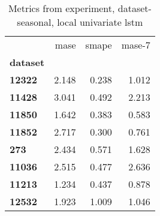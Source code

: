 \begin{table}[h]
\centering
\caption{Metrics from experiment, dataset-seasonal, local univariate lstm}
\label{table:local-univariate-lstm-dataset-seasonal}
\begin{tabular}{lrrr}
\toprule
{} &   mase &  smape &  mase-7 \\
\textbf{dataset} &        &        &         \\
\midrule
\textbf{12322  } &  2.148 &  0.238 &   1.012 \\
\textbf{11428  } &  3.041 &  0.492 &   2.213 \\
\textbf{11850  } &  1.642 &  0.383 &   0.583 \\
\textbf{11852  } &  2.717 &  0.300 &   0.761 \\
\textbf{273    } &  2.434 &  0.571 &   1.628 \\
\textbf{11036  } &  2.515 &  0.477 &   2.636 \\
\textbf{11213  } &  1.234 &  0.437 &   0.878 \\
\textbf{12532  } &  1.923 &  1.009 &   1.046 \\
\bottomrule
\end{tabular}
\end{table}

